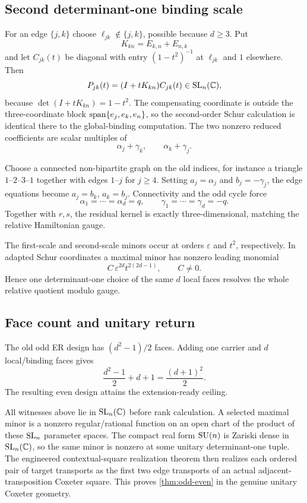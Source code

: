 \subsection{Second determinant-one binding scale}
For an edge $\{j,k\}$ choose $\ell_{jk}\notin\{j,k\}$, possible because $d\ge3$. Put
\[
K_{kn}=E_{k,n}+E_{n,k}
\]
and let $C_{jk}(t)$ be diagonal with entry $(1-t^2)^{-1}$ at $\ell_{jk}$ and $1$ elsewhere. Then
\[
P_{jk}(t)=(I+tK_{kn})C_{jk}(t)\in\operatorname{SL}_n(\mathbb C),
\]
because $\det(I+tK_{kn})=1-t^2$. The compensating coordinate is outside the three-coordinate block $\operatorname{span}\{e_j,e_k,e_n\}$, so the second-order Schur calculation is identical there to the global-binding computation. The two nonzero reduced coefficients are scalar multiples of
\begin{equation}\label{eq:edge-bindings}
\alpha_j+\gamma_k,\qquad
\alpha_k+\gamma_j.
\end{equation}

Choose a connected non-bipartite graph on the old indices, for instance a triangle $1$--$2$--$3$--$1$ together with edges $1$--$j$ for $j\ge4$. Setting $a_j=\alpha_j$ and $b_j=-\gamma_j$, the edge equations become $a_j=b_k$, $a_k=b_j$. Connectivity and the odd cycle force
\[
\alpha_1=\cdots=\alpha_d=q,\qquad
\gamma_1=\cdots=\gamma_d=-q.
\]
Together with $r,s$, the residual kernel is exactly three-dimensional, matching the relative Hamiltonian gauge.

The first-scale and second-scale minors occur at orders $\varepsilon$ and $t^2$, respectively. In adapted Schur coordinates a maximal minor has nonzero leading monomial
\[
C\,\varepsilon^{2d}t^{2(2d-1)},\qquad C\ne0.
\]
Hence one determinant-one choice of the same $d$ local faces resolves the whole relative quotient modulo gauge.

\subsection{Face count and unitary return}
The old odd ER design has $(d^2-1)/2$ faces. Adding one carrier and $d$ local/binding faces gives
\begin{equation}\label{eq:transfer-count}
\frac{d^2-1}{2}+d+1=\frac{(d+1)^2}{2}.
\end{equation}
The resulting even design attains the extension-ready ceiling.

All witnesses above lie in $\operatorname{SL}_n(\mathbb C)$ before rank calculation. A selected maximal minor is a nonzero regular/rational function on an open chart of the product of these $\operatorname{SL}_n$ parameter spaces. The compact real form $\operatorname{SU}(n)$ is Zariski dense in $\operatorname{SL}_n(\mathbb C)$, so the same minor is nonzero at some unitary determinant-one tuple. The engineered contextual-square realization theorem then realizes each ordered pair of target transports as the first two edge transports of an actual adjacent-transposition Coxeter square. This proves \cref{thm:odd-even} in the genuine unitary Coxeter geometry.
